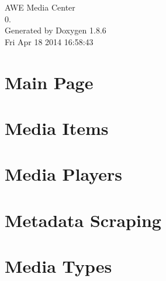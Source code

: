 \documentclass[twoside]{book}
\newcommand{\clearemptydoublepage}{%
  \newpage{\pagestyle{empty}\cleardoublepage}%
}
\begin{document}
\hypersetup{pageanchor=false}
\begin{titlepage}
\vspace*{7cm}
\begin{center}%
{\Large A\-W\-E Media Center \\[1ex]\large 0. }\\
\vspace*{1cm}
{\large Generated by Doxygen 1.8.6}\\
\vspace*{0.5cm}
{\small Fri Apr 18 2014 16:58:43}\\
\end{center}
\end{titlepage}
\clearemptydoublepage
\tableofcontents
\clearemptydoublepage
{}
\hypersetup{pageanchor=true}

\chapter{Main Page}
\label{index}\hypertarget{index}{}
\chapter{Media Items}
\label{md___users__alex_github__a_w_e_media_center__code_items__r_e_a_d_m_e}
\hypertarget{md___users__alex_github__a_w_e_media_center__code_items__r_e_a_d_m_e}{}

\chapter{Media Players}
\label{md___users__alex_github__a_w_e_media_center__code_player__r_e_a_d_m_e}
\hypertarget{md___users__alex_github__a_w_e_media_center__code_player__r_e_a_d_m_e}{}

\chapter{Metadata Scraping}
\label{md___users__alex_github__a_w_e_media_center__code_scraper__r_e_a_d_m_e}
\hypertarget{md___users__alex_github__a_w_e_media_center__code_scraper__r_e_a_d_m_e}{}

\chapter{Media Types}
\label{md___users__alex_github__a_w_e_media_center__code_type__r_e_a_d_m_e}
\hypertarget{md___users__alex_github__a_w_e_media_center__code_type__r_e_a_d_m_e}{}

\end{document}
